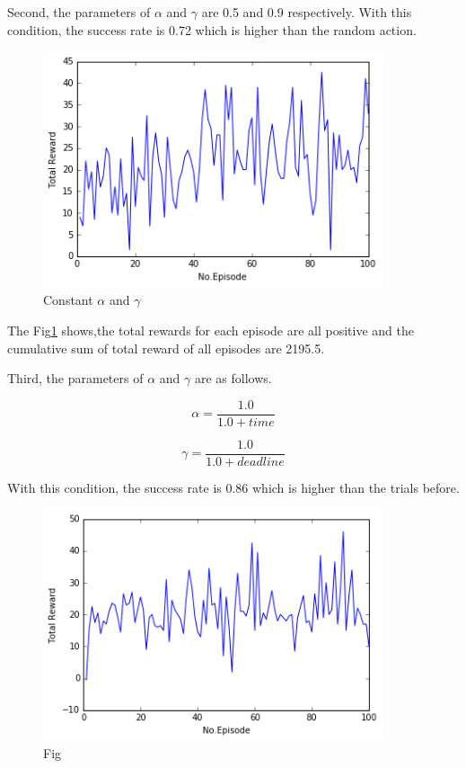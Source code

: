 \documentclass[a4paper,11pt]{article}
\begin{document}

Second, the parameters of $\alpha$ and $\gamma$ are 0.5 and 0.9 respectively.
With this condition, the success rate is 0.72 which is higher than the random action.

\begin{figure}[H]
\begin{center}
\includegraphics[width=100mm]{graph/constant.jpg}
\end{center}
\caption{Constant $\alpha$ and $\gamma$}
\label{fig:two}
\end{figure}

The Fig\ref{fig:two} shows,the total rewards for each episode are all positive and the cumulative sum of total reward of all episodes are 2195.5.




Third, the parameters of $\alpha$ and $\gamma$ are as follows.

\begin{equation}
	\alpha=\frac{1.0}{1.0+time}
\end{equation}

\begin{equation}
	\gamma=\frac{1.0}{1.0+deadline}
\end{equation}

With this condition, the success rate is 0.86 which is higher than the trials before.


\begin{figure}[H]
\begin{center}
\includegraphics[width=100mm]{graph/better.jpg}
\end{center}
\caption{Fig}
\label{fig:three}
\end{figure}
\end{document}
